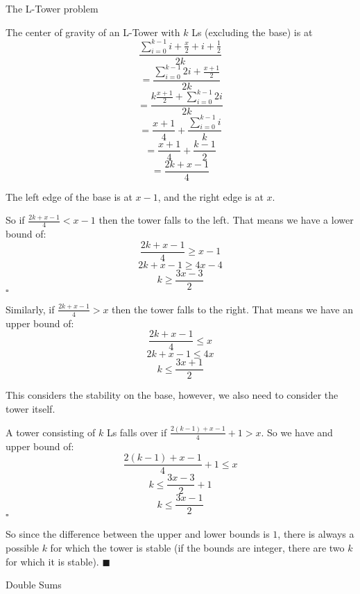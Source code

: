 \documentclass[../main.tex]{subfiles}
\begin{document}
\begin{questions}

  \question The L-Tower problem
  \begin{solution}
    The center of gravity of an L-Tower with $k$ Ls (excluding the base) is at
    $$
    \frac{\sum_{i=0}^{k-1} i+\frac{x}{2} + i+\frac{1}{2}}{2k}
    $$
    $$
    = \frac{\sum_{i=0}^{k-1} 2i + \frac{x+1}{2}}{2k} 
    $$
    $$
    = \frac{k\frac{x+1}{2} + \sum_{i=0}^{k-1} 2i}{2k} 
    $$
    $$
    = \frac{x+1}{4} + \frac{\sum_{i=0}^{k-1} i}{k}
    $$
    $$
    = \frac{x+1}{4} + \frac{k-1}{2}
    $$
    $$
    = \frac{2k+x-1}{4}
    $$

    The left edge of the base is at $x-1$, and the right edge is at $x$.

    So if $\frac{2k+x-1}{4} < x-1$ then the tower falls to the left. That means we have a lower bound of:
    $$
    \frac{2k+x-1}{4} \ge x-1
    $$
    $$
    2k+x-1 \ge 4x-4
    $$
    $$
    k \ge \frac{3x-3}{2}
    $$
    \hfill$\square$

    Similarly, if $\frac{2k+x-1}{4} > x$ then the tower falls to the right. That means we have an upper bound of:
    $$
    \frac{2k+x-1}{4} \le x
    $$
    $$
    2k+x-1 \le 4x
    $$
    $$
    k \le \frac{3x+1}{2}
    $$

    This considers the stability on the base, however, we also need to consider the tower itself.

    A tower consisting of $k$ Ls falls over if $\frac{2(k-1)+x-1}{4}+1 > x$. So we have and upper bound of:
    $$
    \frac{2(k-1)+x-1}{4}+1 \le x
    $$
    $$
    k \le \frac{3x-3}{2} + 1
    $$
    $$
    k \le \frac{3x-1}{2}
    $$
    \hfill$\square$

    So since the difference between the upper and lower bounds is $1$, there is always a possible $k$ for which the tower is stable (if the bounds are integer, there are two $k$ for which it is stable).
    \hfill$\blacksquare$
  \end{solution}

  \question Double Sums

\end{questions}
\end{document}

